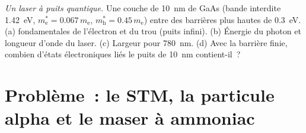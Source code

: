 \begin{exercise}[$\star\star\star$]\label{exo:b2:potential-wells-tunneling:12}
\emph{Un laser à puits quantique.} Une couche de \qty{10}{nm} de GaAs (bande interdite
\qty{1.42}{eV}, $m_{\text{e}}^* = 0.067\,m_{\text{e}}$, $m_{\text{h}}^* = 0.45\,m_{\text{e}}$)
entre des barrières plus hautes de \qty{0.3}{eV}. (a)  fondamentales
de l'électron et du trou (puits infini). (b) Énergie du photon et longueur d'onde
du laser. (c) Largeur pour \qty{780}{nm}. (d) Avec la barrière finie,
combien d'états électroniques liés le puits de \qty{10}{nm} contient-il~?
\end{exercise}

\section{Problème~: le STM, la particule alpha et le maser à ammoniac}

